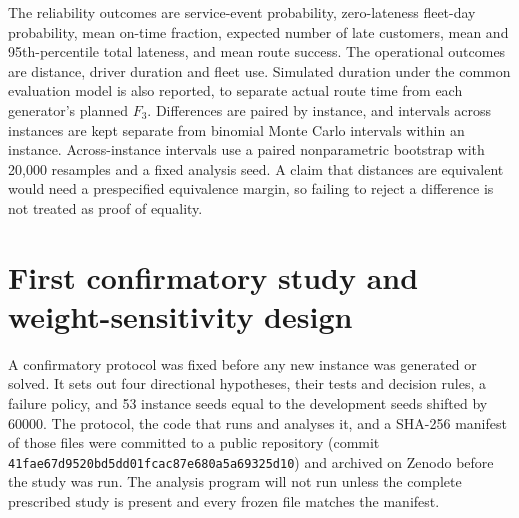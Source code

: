 \documentclass[11pt,a4paper]{article}
\begin{document}
The reliability outcomes are service-event probability, zero-lateness fleet-day
probability, mean on-time fraction, expected number of late customers, mean and
95th-percentile total lateness, and mean route success. The operational outcomes
are distance, driver duration and fleet use. Simulated duration under the common
evaluation model is also reported, to separate actual route time from each
generator's planned $F_3$. Differences are paired by instance, and intervals
across instances are kept separate from binomial Monte Carlo intervals within an
instance. Across-instance intervals use a paired nonparametric bootstrap with
20,000 resamples and a fixed analysis seed. A claim that distances are equivalent
would need a prespecified equivalence margin, so failing to reject a difference
is not treated as proof of equality.

\section{First confirmatory study and weight-sensitivity design}\label{sec:confdesign}

A confirmatory protocol was fixed before any new instance was generated or
solved. It sets out four directional hypotheses, their tests and decision rules,
a failure policy, and 53 instance seeds equal to the development seeds shifted by
60000. The protocol, the code that runs and analyses it, and a SHA-256 manifest
of those files were committed to a public repository (commit
\texttt{41fae67d9520bd5dd01fcac87e680a5a69325d10}) and archived on Zenodo
\cite{ali2026freeze} before the study was run. The analysis program will not run
unless the complete prescribed study is present and every frozen file matches
the manifest.
\end{document}
